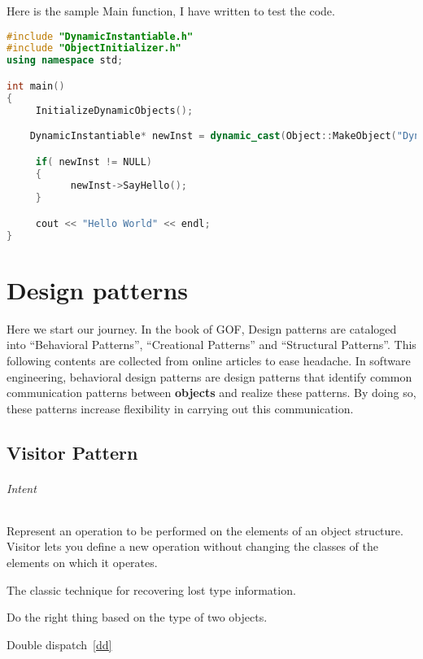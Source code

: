 \documentclass{book}
\newcounter{subpart}
\begin{document}
Here is the sample Main function, I have written to test the code.

\begin{lstlisting}[caption={Prototype Pattern sample DI},language=C++]
#include "DynamicInstantiable.h"
#include "ObjectInitializer.h"
using namespace std;

int main()
{
     InitializeDynamicObjects();

    DynamicInstantiable* newInst = dynamic_cast(Object::MakeObject("DynamicInstantiable"));

     if( newInst != NULL)
     {
           newInst->SayHello();
     }

     cout << "Hello World" << endl;
}
\end{lstlisting}


\part{Design patterns}
Here we start our journey.
In the book of GOF, Design patterns are cataloged into ``Behavioral Patterns'', ``Creational Patterns'' and ``Structural Patterns''. 
This following contents are collected from online articles to ease headache.
In software engineering, behavioral design patterns are design patterns that identify common communication patterns between \textbf{objects} and realize these patterns.
By doing so, these patterns increase flexibility in carrying out this communication.
\chapter{Visitor Pattern}\label{VisitorPattern}

\paragraph{Intent}\mbox{}
Represent an operation to be performed on the elements of an object structure. Visitor lets you define a new operation without changing the classes of the elements on which it operates.

    The classic technique for recovering lost type information.

    Do the right thing based on the type of two objects.

    Double dispatch~\ref{dd}
\end{document}
